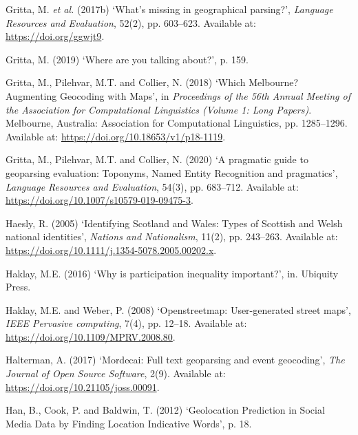 \documentclass[
  letterpaper,
  11pt,
  english,
  onehalfspacing,
  headsepline]{MastersDoctoralThesis}
\newlength{\cslhangindent}
\newlength{\cslentryspacingunit} %
\newenvironment{CSLReferences}[2] %
 {%
  \setlength{\parindent}{0pt}
  \ifodd #1
  \let\oldpar\par
  \def\par{\hangindent=\cslhangindent\oldpar}
  \fi
  \setlength{\parskip}{#2\cslentryspacingunit}
 }%
 {}
\begin{document}
\begin{CSLReferences}{0}{0}
\leavevmode{}%
Gritta, M. \emph{et al.} (2017b) {`What's missing in geographical
parsing?'}, \emph{Language Resources and Evaluation}, 52(2), pp.
603--623. Available at: \url{https://doi.org/ggwjt9}.

\leavevmode{}%
Gritta, M. (2019) {`Where are you talking about?'}, p. 159.

\leavevmode{}%
Gritta, M., Pilehvar, M.T. and Collier, N. (2018) {`Which {Melbourne}?
{Augmenting Geocoding} with {Maps}'}, in \emph{Proceedings of the 56th
{Annual Meeting} of the {Association} for {Computational Linguistics}
({Volume} 1: {Long Papers})}. {Melbourne, Australia}: {Association for
Computational Linguistics}, pp. 1285--1296. Available at:
\url{https://doi.org/10.18653/v1/p18-1119}.

\leavevmode{}%
Gritta, M., Pilehvar, M.T. and Collier, N. (2020) {`A pragmatic guide to
geoparsing evaluation: {Toponyms}, {Named Entity Recognition} and
pragmatics'}, \emph{Language Resources and Evaluation}, 54(3), pp.
683--712. Available at:
\url{https://doi.org/10.1007/s10579-019-09475-3}.

\leavevmode{}%
Haesly, R. (2005) {`Identifying {Scotland} and {Wales}: Types of
{Scottish} and {Welsh} national identities'}, \emph{Nations and
Nationalism}, 11(2), pp. 243--263. Available at:
\url{https://doi.org/10.1111/j.1354-5078.2005.00202.x}.

\leavevmode{}%
Haklay, M.E. (2016) {`Why is participation inequality important?'}, in.
{Ubiquity Press}.

\leavevmode{}%
Haklay, M.E. and Weber, P. (2008) {`Openstreetmap: {User-generated}
street maps'}, \emph{IEEE Pervasive computing}, 7(4), pp. 12--18.
Available at: \url{https://doi.org/10.1109/MPRV.2008.80}.

\leavevmode{}%
Halterman, A. (2017) {`Mordecai: {Full} text geoparsing and event
geocoding'}, \emph{The Journal of Open Source Software}, 2(9). Available
at: \url{https://doi.org/10.21105/joss.00091}.

\leavevmode{}%
Han, B., Cook, P. and Baldwin, T. (2012) {`Geolocation {Prediction} in
{Social Media Data} by {Finding Location Indicative Words}'}, p. 18.


\end{CSLReferences}
\end{document}
